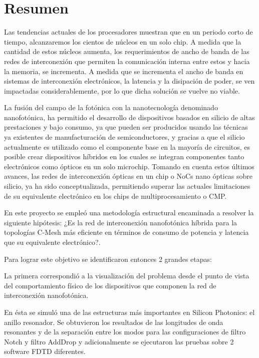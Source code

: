 \section{Resumen}
Las tendencias actuales de los procesadores muestran que en un periodo corto de tiempo, 
alcanzaremos los cientos de núcleos en un solo chip. 
A medida que la cantidad de estos núcleos aumenta, los requerimientos de ancho de banda 
de las redes de interconexión que permiten la comunicación interna entre estos y 
hacia la memoria, se incrementa. A medida que se incrementa el ancho de banda en 
sistemas de interconexión electrónicos, la latencia y la disipación de poder, 
se ven impactadas considerablemente, por lo que dicha solución se vuelve no viable.

La fusión del campo de la fotónica con la nanotecnología denominado 
nanofotónica, ha permitido el desarrollo de dispositivos
basados en silicio de altas prestaciones y bajo consumo, ya que pueden 
ser producidos usando las técnicas ya existentes de manufacturación de semiconductores, 
y gracias a que el silicio actualmente es utilizado como el componente base 
en la mayoría de circuitos, es posible crear dispositivos híbridos en los cuales 
se integran componentes tanto electrónicos como ópticos en un solo microchip. 
Tomando en cuenta estos últimos avances, las redes de interconexión ópticas 
en un chip o NoCs nano ópticas sobre silicio, ya ha sido conceptualizada, 
permitiendo superar las actuales limitaciones de su equivalente electrónico 
en los chips de multiprocesamiento o CMP.

En este proyecto se empleó una metodología estructural encaminada a resolver
la siguiente hipótesis: ¿Es la red de interconexión nanofotónica híbrida para la
topologías C-Mesh más eficiente en términos de consumo de potencia
 y latencia que su equivalente electrónico?. 

Para lograr este objetivo se identificaron entonces 2 grandes etapas: 

La primera correspondió
a la visualización del problema desde el punto de vista del comportamiento físico de
los dispositivos que componen la red de interconexión nanofotónica. 

En ésta se simuló
una de las estructuras más importantes en Silicon Photonics: el anillo resonador. Se 
obtuvieron los resultados de las longitudes de onda resonantes y de la separación
entre los modos para las configuraciones de filtro Notch y filtro AddDrop y adicionalmente
se ejecutaron las pruebas sobre 2 software FDTD diferentes.


